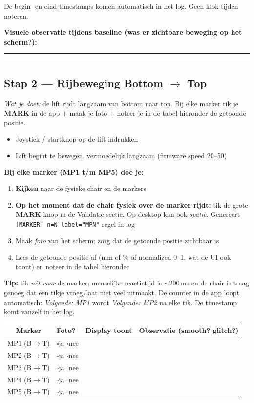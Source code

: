 \documentclass[11pt, a4paper]{article}
\newcommand{\cbox}{$\square$\;}
\newcommand{\fillblock}[1]{\rule[-0.5ex]{#1}{0.4pt}}
\begin{document}
De begin- en eind-timestamps komen automatisch in het log. Geen
klok-tijden noteren.

\textbf{Visuele observatie tijdens baseline (was er zichtbare beweging op het scherm?):}

\fillblock{\textwidth}\hfill\fillblock{\textwidth}

\subsection{Stap 2 — Rijbeweging Bottom $\to$ Top}

\textit{Wat je doet:} de lift rijdt langzaam van bottom naar top. Bij
elke marker tik je \textbf{MARK} in de app + maak je foto + noteer je
in de tabel hieronder de getoonde positie.

\begin{itemize}[leftmargin=2em, label=$\square$]
  \item Joystick / startknop op de lift indrukken
  \item Lift begint te bewegen, vermoedelijk langzaam (firmware speed 20--50)
\end{itemize}

\textbf{Bij elke marker (MP1 t/m MP5) doe je:}

\begin{enumerate}[leftmargin=2.5em]
  \item \textbf{Kijken} naar de fysieke chair en de markers
  \item \textbf{Op het moment dat de chair fysiek over de marker rijdt:} tik de grote \textbf{MARK} knop in de Validatie-sectie. Op desktop kan ook \emph{spatie}. Genereert \texttt{[MARKER] n=N label="MPN"} regel in log
  \item Maak \emph{foto} van het scherm: zorg dat de getoonde positie zichtbaar is
  \item Lees de getoonde positie af (mm of \% of normalized 0--1, wat de UI ook toont) en noteer in de tabel hieronder
\end{enumerate}

\textbf{Tip:} tik \emph{nét voor} de marker; menselijke reactietijd is
$\sim$200\,ms en de chair is traag genoeg dat een tikje vroeg/laat niet
veel uitmaakt. De counter in de app loopt automatisch: \emph{Volgende:
MP1} wordt \emph{Volgende: MP2} na elke tik. De timestamp komt vanzelf
in het log.

\renewcommand{\arraystretch}{1.9}
\begin{tabular}{@{}|c|p{2cm}|p{3cm}|p{5cm}|@{}}
\hline
\textbf{Marker} & \textbf{Foto?} & \textbf{Display toont} & \textbf{Observatie (smooth? glitch?)} \\ \hline
MP1 (B$\to$T) & \cbox ja \cbox nee & & \\ \hline
MP2 (B$\to$T) & \cbox ja \cbox nee & & \\ \hline
MP3 (B$\to$T) & \cbox ja \cbox nee & & \\ \hline
MP4 (B$\to$T) & \cbox ja \cbox nee & & \\ \hline
MP5 (B$\to$T) & \cbox ja \cbox nee & & \\ \hline
\end{tabular}
\renewcommand{\arraystretch}{1.0}
\end{document}

